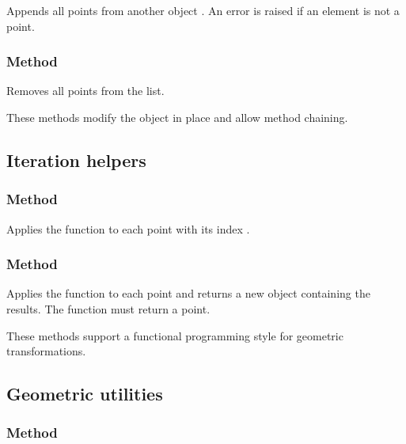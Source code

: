 Appends all points from another  object . An error is raised if an element is not a point.

\subsubsection{Method }
\label{ssub:meth_list_point_clear}

Removes all points from the list.


These methods modify the object in place and allow method chaining.

\subsection{Iteration helpers}
\label{subsec:list_point_iteration}

\subsubsection{Method }
\label{ssub:meth_list_point_foreach}

Applies the function  to each point  with its index .

\subsubsection{Method }
\label{ssub:meth_list_point_map}

Applies the function  to each point and returns a new  object
containing the results. The function must return a point.


These methods support a functional programming style for geometric transformations.

\subsection{Geometric utilities}
\label{subsec:list_point_geometry}

\subsubsection{Method }
\label{ssub:meth_list_point_barycenter}

